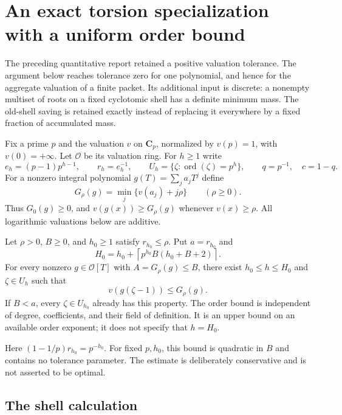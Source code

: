 \section{An exact torsion specialization with a uniform order bound}
\label{sec:exact-torsion}

The preceding quantitative report retained a positive valuation tolerance.
The argument below reaches tolerance zero for one polynomial, and hence
for the aggregate valuation of a finite packet.  Its additional input is
discrete: a nonempty multiset of roots on a fixed cyclotomic shell has a
definite minimum mass.  The old-shell saving is retained exactly instead
of replacing it everywhere by a fixed fraction of accumulated mass.

Fix a prime $p$ and the valuation $v$ on $\mathbf C_p$, normalized by
$v(p)=1$, with $v(0)=+\infty$.  Let $\mathcal O$ be its valuation ring.
For $h\geq1$ write
\[
 e_h=(p-1)p^{h-1},\qquad r_h=e_h^{-1},\qquad
 U_h=\{\zeta:\operatorname{ord}(\zeta)=p^h\},\qquad
 q=p^{-1},\quad c=1-q.
\]
For a nonzero integral polynomial $g(T)=\sum_j a_jT^j$ define
\[
 G_\rho(g)=\min_j\{v(a_j)+j\rho\}\qquad(\rho\geq0).
\]
Thus $G_0(g)\geq0$, and $v(g(x))\geq G_\rho(g)$ whenever
$v(x)\geq\rho$.  All logarithmic valuations below are additive.

\begin{theorem}\label{thm:exact-selector}
Let $\rho>0$, $B\geq0$, and $h_0\geq1$ satisfy $r_{h_0}\leq\rho$.
Put $a=r_{h_0}$ and
\[
 H_0=h_0+\left\lceil p^{h_0}B(h_0+B+2)\right\rceil.
\]
For every nonzero $g\in\mathcal O[T]$ with $A=G_\rho(g)\leq B$,
there exist $h_0\leq h\leq H_0$ and $\zeta\in U_h$ such that
\[
                 v(g(\zeta-1))\leq G_\rho(g).
\]
If $B<a$, every $\zeta\in U_{h_0}$ already has this property.
The order bound is independent of degree, coefficients, and their field
of definition.  It is an upper bound on an available order exponent;
it does not specify that $h=H_0$.
\end{theorem}

Here $(1-1/p)r_{h_0}=p^{-h_0}$.  For fixed $p,h_0$, this bound is
quadratic in $B$ and contains no
tolerance parameter.  The estimate is deliberately conservative and is
not asserted to be optimal.

\subsection{The shell calculation}

